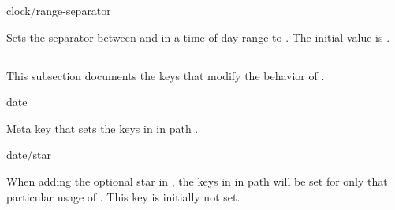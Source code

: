 \documentclass{beery}
\begin{document}

\begin{variable}{clock/range-separator}
  \begin{syntax}
  \end{syntax}
  Sets the separator between  and  in a time of day range to .
  The initial value is .
\end{variable}


\subsection{}
\label{subsec:date}

This subsection documents the keys that modify the behavior of .

\begin{variable}{date}
  \begin{syntax}
  \end{syntax}
  Meta key that sets the keys in  in path .
\end{variable}

\begin{variable}{date/star}
  \begin{syntax}
  \end{syntax}
  When adding the optional star in , the keys in  in path  will be set for only that particular usage of .
  This key is initially not set.
\end{variable}
\end{document}
